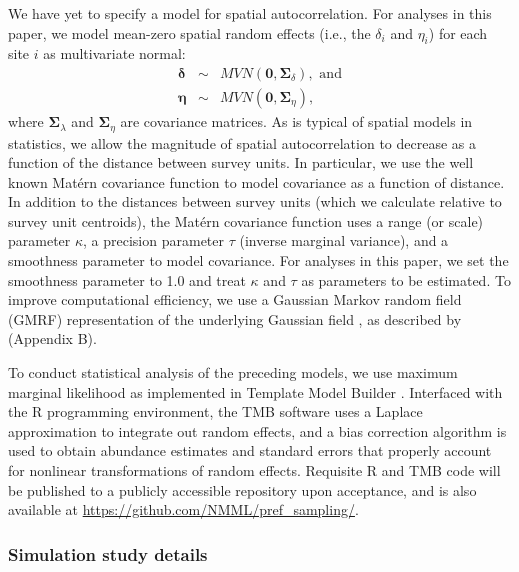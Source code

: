 \documentclass[times,mee,doublespace,]{besauth2}
\begin{document}
\begin{flushleft}
\hspace{0.5in} We have yet to specify a model for spatial autocorrelation.  For analyses in this paper, we model mean-zero spatial random effects (i.e., the $\delta_i$ and $\eta_i$) for each site $i$ as multivariate normal:
\begin{eqnarray*}
  \boldsymbol{\delta} & \sim & MVN(\textbf{0},\boldsymbol{\Sigma}_{\delta}), \text{ and} \\
  \boldsymbol{\eta} & \sim & MVN(\textbf{0},\boldsymbol{\Sigma}_{\eta}),
\end{eqnarray*}
where $\boldsymbol{\Sigma}_{\lambda}$ and $\boldsymbol{\Sigma}_{\eta}$ are covariance matrices.  As is typical of spatial models in statistics, we allow the magnitude of spatial autocorrelation to decrease as a function of the distance between survey units.  In particular, we use the well known Mat\'{e}rn covariance function to model covariance as a function of distance.  In addition to the distances between survey units (which we calculate relative to survey unit centroids), the Mat\'{e}rn covariance function uses a range (or scale) parameter $\kappa$, a precision parameter $\tau$ (inverse marginal variance), and a smoothness parameter to model covariance.  For analyses in this paper, we set the smoothness parameter to 1.0 and treat $\kappa$ and $\tau$ as parameters to be estimated.  To improve computational efficiency, we use a Gaussian Markov random field (GMRF) representation of the underlying Gaussian field \citep{LindgrenEtAl2011}, as described by \citet{ThorsonEtAl2015} (Appendix B).

\hspace{0.5in} To conduct statistical analysis of the preceding models, we use maximum marginal likelihood as implemented in Template Model Builder \citep[TMB; ][]{KristensenEtAl2016}. Interfaced with the R programming environment, the TMB software uses a Laplace approximation to integrate out random effects, and a bias correction algorithm \citep{TierneyEtAl1989,ThorsonKristensen2016} is used to obtain abundance estimates and standard errors that properly account for nonlinear transformations of random effects.  Requisite R and TMB code will be published to a publicly accessible repository upon acceptance, and is also available at \url{https://github.com/NMML/pref_sampling/}.

\subsubsection*{Simulation study details}


\end{flushleft}
\end{document}
